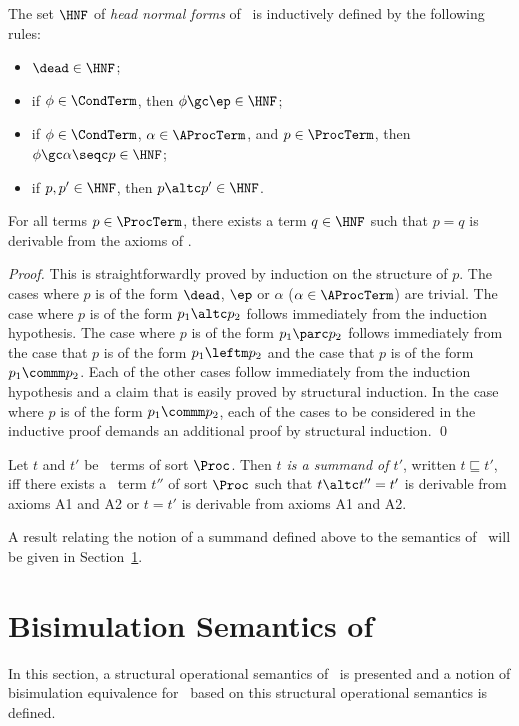 \documentclass[runningheads]{llncs}
\begin{document}
The set $\HNF$ of \emph{head normal forms} of \deACPei\ is inductively 
defined by the following rules:
\begin{itemize}
\item 
$\dead \in \HNF$;
\item 
if $\phi \in \CondTerm$, then $\phi \gc \ep \in \HNF$;
\item 
if $\phi \in \CondTerm$, $\alpha \in \AProcTerm$, and $p \in \ProcTerm$, 
then $\phi \gc \alpha \seqc p \in \HNF$;
\item 
if $p,p' \in \HNF$, then $p \altc p' \in \HNF$.
\end{itemize}
%
\begin{lemma}
\label{lemma-HNF}
For all terms $p \in \ProcTerm$, there exists a term $q \in \HNF$ such 
that $p = q$ is derivable from the axioms of \deACPei.
\end{lemma}
%
\begin{proof}
This is straightforwardly proved by induction on the structure of $p$.
The cases where $p$ is of the form $\dead$, $\ep$ or $\alpha$
($\alpha \in \AProcTerm$) are trivial.
The case where $p$ is of the form $p_1 \altc p_2$ follows immediately
from the induction hypothesis. 
The case where $p$ is of the form $p_1 \parc p_2$ follows immediately
from the case that $p$ is of the form $p_1 \leftm p_2$ and the case that
$p$ is of the form $p_1 \commm p_2$.
Each of the other cases follow immediately from the induction hypothesis
and a claim that is easily proved by structural induction.
In the case where $p$ is of the form $p_1 \commm p_2$, each of the cases
to be considered in the inductive proof demands an additional proof by
structural induction.
\qed
\end{proof}

Let $t$ and $t'$ be \deACPei\ terms of sort $\Proc$.
Then \emph{$t$ is a summand of $t'$}, written $t \sqsubseteq t'$, iff
there exists a \deACPei\ term $t''$ of sort $\Proc$ such that
$t \altc t'' = t'$ is derivable from axioms A1 and A2 or $t = t'$ is 
derivable from axioms A1 and A2. 

A result relating the notion of a summand defined above to the semantics 
of \deACPei\ will be given in Section~\ref{sect-semantics}.

\section{Bisimulation Semantics of \deACPei}
\label{sect-semantics}

In this section, a structural operational semantics of \deACPei\ is 
presented and a notion of bisimulation equivalence for \deACPei\ based 
on this structural operational semantics is defined.
\end{document}
